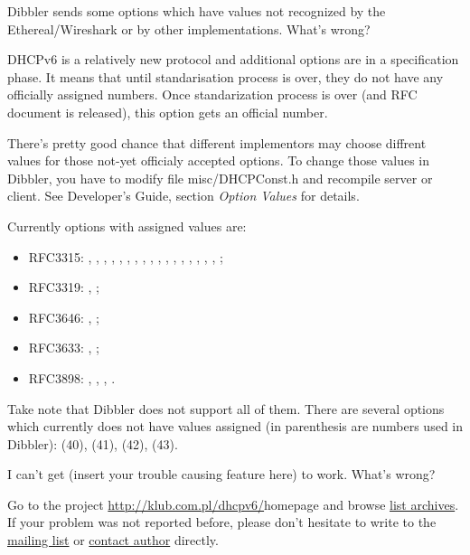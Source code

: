 \Q Dibbler sends some options which have values not recognized by the
Ethereal/Wireshark or by other implementations. What's wrong?

\A DHCPv6 is a relatively new protocol and additional options are in a
specification phase. It means that until standarisation process is
over, they do not have any officially assigned numbers. Once
standarization process is over (and RFC document is released), this
option gets an official number. 

There's pretty good chance that different implementors may choose
diffrent values for those not-yet officialy accepted options. To
change those values in Dibbler, you have to modify file
misc/DHCPConst.h and recompile server or client. See Developer's
Guide, section \emph{Option Values} for details.

Currently options with assigned values are: 
\begin{itemize}
\item RFC3315: ,
, , , ,
, , ,
, , , ,
, , ,
, , ;
\item RFC3319:
, ;
\item RFC3646: ,
;
\item RFC3633: , ;
\item RFC3898:
, , ,
. 

\end{itemize}
Take note that Dibbler does not support all of
them. There are several options which currently does not have values
assigned (in parenthesis are numbers used in Dibbler):
 (40),  (41),  (42),
 (43).

\Q I can't get (insert your trouble causing feature here) to
work. What's wrong? 

\A Go to the project \url{http://klub.com.pl/dhcpv6/}{homepage} and
browse \href{http://klub.com.pl/lists/dibbler/}{list archives}. If
your problem was not reported before, please don't hesitate to write
to the
\href{http://klub.com.pl/cgi-bin/mailman/listinfo/dibbler}{mailing
  list} or \href{mailto:thomson(at)klub.com.pl}{contact author}
directly. 

